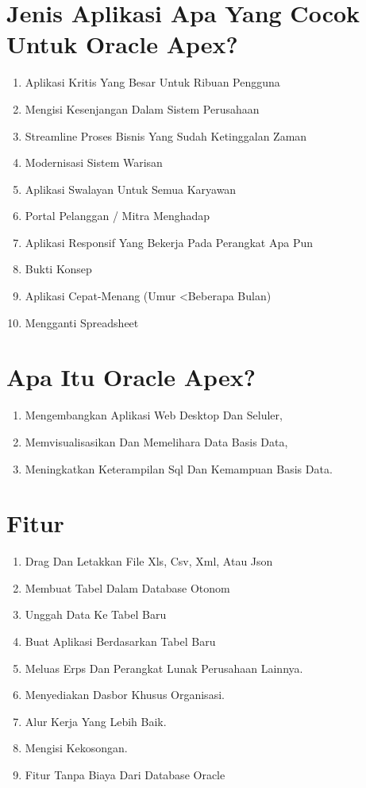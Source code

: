 \documentclass{article}
\begin{document}
\section {Jenis Aplikasi Apa Yang Cocok Untuk Oracle Apex?}
\begin{enumerate}
    \item Aplikasi Kritis Yang Besar Untuk Ribuan Pengguna
    \item Mengisi Kesenjangan Dalam Sistem Perusahaan
    \item Streamline Proses Bisnis Yang Sudah Ketinggalan Zaman
    \item Modernisasi Sistem Warisan
    \item Aplikasi Swalayan Untuk Semua Karyawan
    \item Portal Pelanggan / Mitra Menghadap
    \item Aplikasi Responsif Yang Bekerja Pada Perangkat Apa Pun
    \item Bukti Konsep
    \item Aplikasi Cepat-Menang (Umur <Beberapa Bulan)
    \item Mengganti Spreadsheet

\end{enumerate}

\section{Apa Itu Oracle Apex?}
\begin{enumerate}
    \item Mengembangkan Aplikasi Web Desktop Dan Seluler, 
    \item Memvisualisasikan Dan Memelihara Data Basis Data, 
    \item Meningkatkan Keterampilan Sql Dan Kemampuan Basis Data.

\end{enumerate}

\usepackage{Oracle Apex: Use Cases}

\section{Fitur}
\begin{enumerate}
    \item Drag Dan Letakkan File Xls, Csv, Xml, Atau Json
    \item Membuat Tabel Dalam Database Otonom
    \item Unggah Data Ke Tabel Baru
    \item Buat Aplikasi Berdasarkan Tabel Baru
    \item Meluas Erps Dan Perangkat Lunak Perusahaan Lainnya.
    \item Menyediakan Dasbor Khusus Organisasi.
    \item Alur Kerja Yang Lebih Baik.
    \item Mengisi Kekosongan.
    \item Fitur Tanpa Biaya Dari Database Oracle


\end{enumerate}
\end{document}
